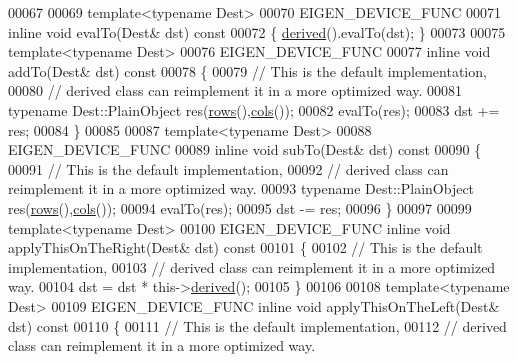 \begin{DoxyCode}
00067 
00069   \textcolor{keyword}{template}<\textcolor{keyword}{typename} Dest>
00070   EIGEN\_DEVICE\_FUNC
00071   \textcolor{keyword}{inline} \textcolor{keywordtype}{void} evalTo(Dest& dst)\textcolor{keyword}{ const}
00072 \textcolor{keyword}{  }\{ \hyperlink{group___core___module_a324b16961a11d2ecfd2d1b7dd7946545}{derived}().evalTo(dst); \}
00073 
00075   \textcolor{keyword}{template}<\textcolor{keyword}{typename} Dest>
00076   EIGEN\_DEVICE\_FUNC
00077   \textcolor{keyword}{inline} \textcolor{keywordtype}{void} addTo(Dest& dst)\textcolor{keyword}{ const}
00078 \textcolor{keyword}{  }\{
00079     \textcolor{comment}{// This is the default implementation,}
00080     \textcolor{comment}{// derived class can reimplement it in a more optimized way.}
00081     \textcolor{keyword}{typename} Dest::PlainObject res(\hyperlink{group___core___module_a8141320ba8df384426c298b32b000d8e}{rows}(),\hyperlink{group___core___module_a7b0b45c7351847696c911ce8aa2abbdb}{cols}());
00082     evalTo(res);
00083     dst += res;
00084   \}
00085 
00087   \textcolor{keyword}{template}<\textcolor{keyword}{typename} Dest>
00088   EIGEN\_DEVICE\_FUNC
00089   \textcolor{keyword}{inline} \textcolor{keywordtype}{void} subTo(Dest& dst)\textcolor{keyword}{ const}
00090 \textcolor{keyword}{  }\{
00091     \textcolor{comment}{// This is the default implementation,}
00092     \textcolor{comment}{// derived class can reimplement it in a more optimized way.}
00093     \textcolor{keyword}{typename} Dest::PlainObject res(\hyperlink{group___core___module_a8141320ba8df384426c298b32b000d8e}{rows}(),\hyperlink{group___core___module_a7b0b45c7351847696c911ce8aa2abbdb}{cols}());
00094     evalTo(res);
00095     dst -= res;
00096   \}
00097 
00099   \textcolor{keyword}{template}<\textcolor{keyword}{typename} Dest>
00100   EIGEN\_DEVICE\_FUNC \textcolor{keyword}{inline} \textcolor{keywordtype}{void} applyThisOnTheRight(Dest& dst)\textcolor{keyword}{ const}
00101 \textcolor{keyword}{  }\{
00102     \textcolor{comment}{// This is the default implementation,}
00103     \textcolor{comment}{// derived class can reimplement it in a more optimized way.}
00104     dst = dst * this->\hyperlink{group___core___module_a324b16961a11d2ecfd2d1b7dd7946545}{derived}();
00105   \}
00106 
00108   \textcolor{keyword}{template}<\textcolor{keyword}{typename} Dest>
00109   EIGEN\_DEVICE\_FUNC \textcolor{keyword}{inline} \textcolor{keywordtype}{void} applyThisOnTheLeft(Dest& dst)\textcolor{keyword}{ const}
00110 \textcolor{keyword}{  }\{
00111     \textcolor{comment}{// This is the default implementation,}
00112     \textcolor{comment}{// derived class can reimplement it in a more optimized way.}

\end{DoxyCode}
